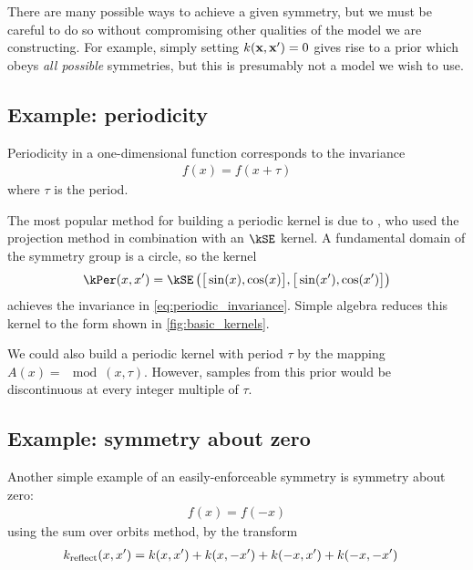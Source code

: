 %
There are many possible ways to achieve a given symmetry, but we must be careful to do so without compromising other qualities of the model we are constructing.
For example, simply setting $k({\bf{x}}, {\bf{x}}') = 0$ gives rise to a \gp{} prior which obeys \emph{all possible} symmetries, but this is presumably not a model we wish to use.






\subsection{Example: periodicity}

Periodicity in a one-dimensional function corresponds to the invariance
%
\begin{align}
f(x) = f( x + \tau)
\label{eq:periodic_invariance}
\end{align}
%
where $\tau$ is the period.

The most popular method for building a periodic kernel is due to \citet{mackay1998introduction}, who used the projection method in combination with an $\kSE$ kernel.
A fundamental domain of the symmetry group is a circle, so the kernel
%
%
\begin{align}
\kPer(x, x') = \kSE \left( \big[ \sin(x), \cos(x) \big], \big[ \sin(x'), \cos(x') \big] \right)
\end{align}
%
achieves the invariance in \cref{eq:periodic_invariance}.
Simple algebra reduces this kernel to the form shown in \cref{fig:basic_kernels}.

We could also build a periodic kernel with period $\tau$ by the mapping $A(x) = \mod(x, \tau)$.
However, samples from this prior would be discontinuous at every integer multiple of $\tau$.

\subsection{Example: symmetry about zero}

Another simple example of an easily-enforceable symmetry is symmetry about zero:
%
\begin{align}
f(x) = f( -x)
\end{align}
%
using the sum over orbits method, by the transform
%
\begin{align}
k_{\textnormal{reflect}}(x, x') & = k(x, x') + k(x, -x') + k(-x, x') + k(-x, -x')
\end{align}

